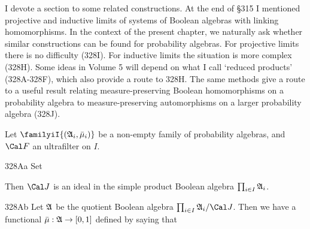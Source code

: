 
\def\chaptername{Measure algebras}
\def\sectionname{Reduced products and other constructions}


I devote a section to some related constructions.   At the
end of \S315 %
I mentioned projective and inductive limits of systems of
Boolean algebras with linking homomorphisms.   In the context of the
present chapter, we naturally ask whether similar constructions can be
found for probability algebras.   For projective limits there is no
difficulty (328I).   For inductive limits the situation is more complex
(328H).   Some ideas in Volume 5 will
depend on what I call `reduced products'
(328A-328F), %
which also provide a route to 328H.   The same methods give a route to
a useful result relating measure-preserving Boolean homomorphisms on a
probability algebra to measure-preserving automorphisms on a larger
probability algebra (328J).

Let $\familyiI{(\frak A_i,\bar\mu_i)}$ be a non-empty family of probability
algebras, and $\Cal F$ an ultrafilter on $I$.

\spheader 328Aa Set


\noindent Then $\Cal J$ is an ideal in the simple
product Boolean algebra $\prod_{i\in I}\frak A_i$.

\spheader 328Ab Let $\frak A$ be the
quotient Boolean algebra $\prod_{i\in I}\frak A_i/\Cal J$.   Then we have a
functional $\bar\mu:\frak A\to[0,1]$ defined by saying that


